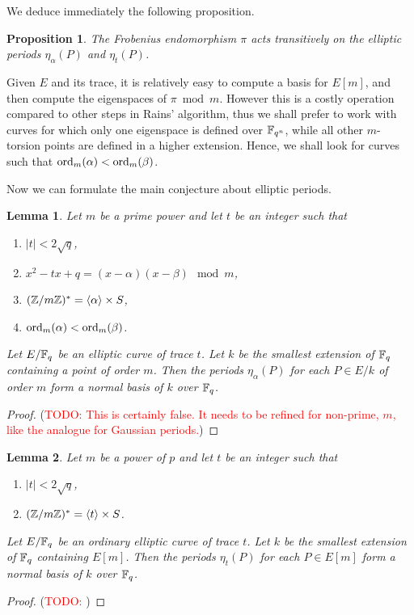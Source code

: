 \documentclass{article}
\newcommand{\todo}[1]{(\textcolor{red}{TODO: #1})}
\newtheorem{Prop}{Proposition}
\newtheorem{Lemma}{Lemma}
\begin{document}
We deduce immediately the following proposition.

\begin{Prop}
  The Frobenius endomorphism $\pi$ acts transitively on the elliptic
  periods $\eta_\alpha(P)$ and $\eta_t(P)$.
\end{Prop}

Given $E$ and its trace, it is relatively easy to compute a basis for
$E[m]$, and then compute the eigenspaces of $\pi\bmod m$. However this
is a costly operation compared to other steps in Rains' algorithm,
thus we shall prefer to work with curves for which only one eigenspace
is defined over $\mathbb{F}_{q^n}$, while all other $m$-torsion points are
defined in a higher extension. Hence, we shall look for curves such
that $\operatorname{ord}_m(\alpha)<\operatorname{ord}_m(\beta)$.

Now we can formulate the main conjecture about elliptic periods.

\begin{Lemma}
  \label{th:elliptic-periods}
  Let $m$ be a prime power and let $t$ be an integer such that
  \begin{enumerate}
  \item $|t|<2\sqrt{q}$,
  \item $x^2-tx+q = (x-\alpha)(x-\beta) \mod m$,
  \item $(\mathbb{Z}/m\mathbb{Z})^\ast = \langle\alpha\rangle \times S$,
  \item $\operatorname{ord}_m(\alpha)<\operatorname{ord}_m(\beta)$.
  \end{enumerate}
  Let $E/\mathbb{F}_q$ be an elliptic curve of trace $t$. Let $k$ be the
  smallest extension of $\mathbb{F}_q$ containing a point of order $m$. Then
  the periods $\eta_\alpha(P)$ for each $P\in E/k$ of order $m$ form a
  normal basis of $k$ over $\mathbb{F}_q$.
\end{Lemma}
\begin{proof}
  \todo{This is certainly false. It needs to be refined for non-prime,
    $m$, like the analogue for Gaussian periods.}
\end{proof}

\begin{Lemma}
  \label{th:elliptic-periods-p}
  Let $m$ be a power of $p$ and let $t$ be an integer such that
  \begin{enumerate}
  \item $|t|<2\sqrt{q}$,
  \item $(\mathbb{Z}/m\mathbb{Z})^\ast = \langle t\rangle \times S$.
  \end{enumerate}
  Let $E/\mathbb{F}_q$ be an ordinary elliptic curve of trace $t$. Let $k$ be
  the smallest extension of $\mathbb{F}_q$ containing $E[m]$. Then the periods
  $\eta_t(P)$ for each $P\in E[m]$ form a normal basis of $k$ over
  $\mathbb{F}_q$.
\end{Lemma}
\begin{proof}
  \todo{}
\end{proof}
\end{document}
